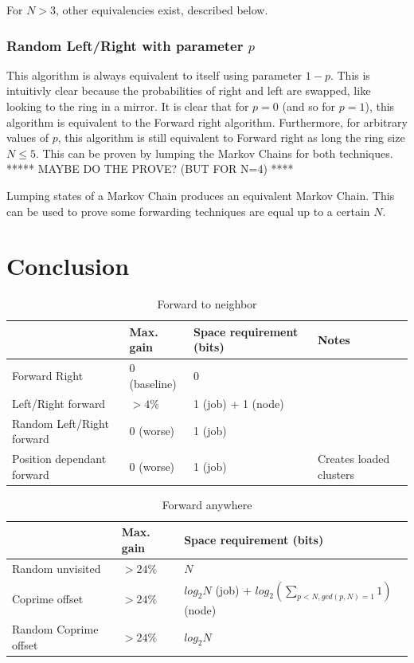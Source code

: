 \documentclass[10pt,a4paper]{article}
\begin{document}
For $N>3$, other equivalencies exist, described below.

\subsubsection*{Random Left/Right with parameter $p$}
This algorithm is always equivalent to itself using parameter $1-p$. This is intuitivly clear because the probabilities of right and left are swapped, like looking to the ring in a mirror.
It is clear that for $p=0$ (and so for $p=1$), this algorithm is equivalent to the Forward right algorithm. Furthermore, for arbitrary values of $p$, this algorithm is still equivalent to Forward right as long the ring size $N \leq 5$. This can be proven by lumping the Markov Chains for both techniques.
***** MAYBE DO THE PROVE? (BUT FOR N=4) ****


Lumping states of a Markov Chain produces an equivalent Markov Chain. This can be used to prove some forwarding techniques are equal up to a certain $N$.

\section{Conclusion}
\label{secconclusion}

\begin{table}[h!]
\centering
\begin{tabular}{|p{}|p{}|p{}|p{}|} \hline
							& Max. gain		& Space requirement (bits)	& Notes \\ \hline
Forward Right				& 0 (baseline)	& 0							&		\\ \hline
Left/Right forward			& $> 4\%$		& 1 (job) + 1 (node)		&		\\ \hline
Random Left/Right forward	& 0 (worse)		& 1 (job)					&		\\ \hline
Position dependant forward	& 0 (worse)		& 1 (job)					& Creates loaded clusters \\ \hline
\end{tabular}
\caption{Forward to neighbor}
\end{table}

\begin{table}[h!]
\centering
\begin{tabular}{|p{}|p{}|p{}|} \hline
							& Max. gain		& Space requirement (bits)	\\ \hline
Random unvisited			& $> 24\%$		& $N$						\\ \hline
Coprime offset				& $> 24\%$		& $log_2 N$ (job) + $log_2 (\sum_{p < N,gcd(p, N) = 1} 1)$ (node) \\ \hline
Random Coprime offset		& $> 24\%$		& $log_2 N$					\\ \hline
\end{tabular}
\caption{Forward anywhere}
\end{table}
\end{document}
